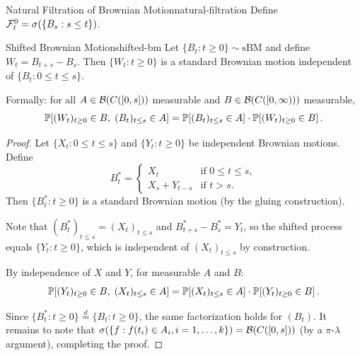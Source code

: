 \begin{example}{Natural Filtration of Brownian Motion}{natural-filtration}
    Define $\mathcal{F}_t^0 = \sigma(\{B_s : s \leq t\})$.
\end{example}

\begin{lemma}{Shifted Brownian Motion}{shifted-bm}
    Let $\{B_t : t \geq 0\} \sim \mathrm{sBM}$ and define $W_t = B_{t+s} - B_s$. Then $\{W_t : t \geq 0\}$ is a standard Brownian motion independent of $\{B_t : 0 \leq t \leq s\}$.

    Formally: for all $A \in \mathcal{B}(C([0,s]))$ measurable and $B \in \mathcal{B}(C([0,\infty)))$ measurable,
    \[
        \mathbb{P}\!\left[(W_t)_{t \geq 0} \in B,\; (B_t)_{t \leq s} \in A\right]
        = \mathbb{P}\!\left[(B_t)_{t \leq s} \in A\right] \cdot \mathbb{P}\!\left[(W_t)_{t \geq 0} \in B\right].
    \]
\end{lemma}

\begin{proof}
    Let $\{X_t : 0 \leq t \leq s\}$ and $\{Y_t : t \geq 0\}$ be independent Brownian motions. Define
    \[
        B_t^* =
        \begin{cases}
            X_t & \text{if } 0 \leq t \leq s, \\
            X_s + Y_{t-s} & \text{if } t > s.
        \end{cases}
    \]
    Then $\{B_t^* : t \geq 0\}$ is a standard Brownian motion (by the gluing construction).

    Note that $(B_t^*)_{t \leq s} = (X_t)_{t \leq s}$ and $B_{t+s}^* - B_s^* = Y_t$, so the shifted process equals $\{Y_t : t \geq 0\}$, which is independent of $(X_t)_{t \leq s}$ by construction.

    By independence of $X$ and $Y$, for measurable $A$ and $B$:
    \[
        \mathbb{P}\!\left[(Y_t)_{t \geq 0} \in B,\; (X_t)_{t \leq s} \in A\right]
        = \mathbb{P}\!\left[(X_t)_{t \leq s} \in A\right] \cdot \mathbb{P}\!\left[(Y_t)_{t \geq 0} \in B\right].
    \]

    Since $\{B_t^* : t \geq 0\} \stackrel{d}{=} \{B_t : t \geq 0\}$, the same factorization holds for $(B_t)$. It remains to note that $\sigma(\{f : f(t_i) \in A_i, i = 1, \ldots, k\}) = \mathcal{B}(C([0,s]))$ (by a $\pi$-$\lambda$ argument), completing the proof.
\end{proof}
